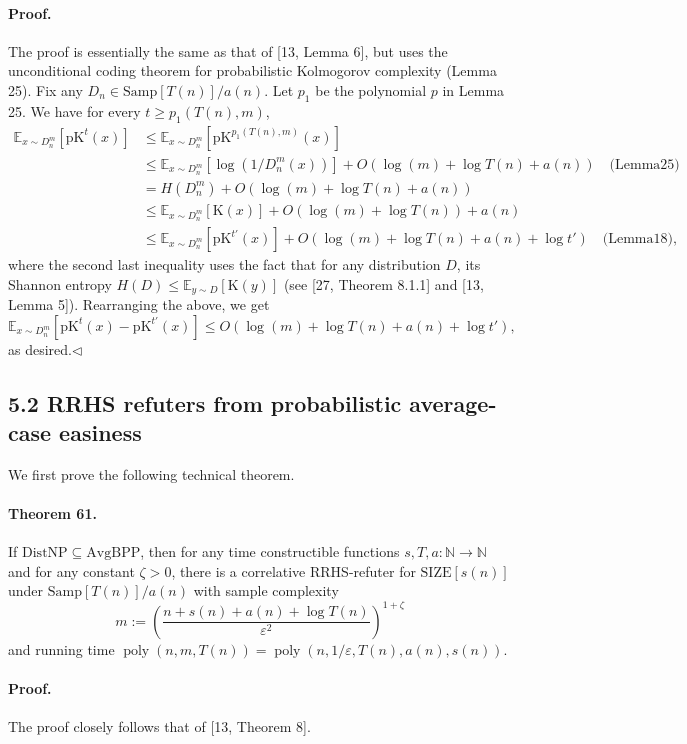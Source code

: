 \paragraph{Proof.} The proof is essentially the same as that of [13, Lemma 6], but uses the unconditional coding theorem for probabilistic Kolmogorov complexity (Lemma 25).
Fix any $D_n\in\mathrm{Samp}[T(n)]/a(n)$. Let $p_1$ be the polynomial $p$ in Lemma 25. We have for every $t\geq p_1(T(n),m)$,
\begin{align*}
\mathbb E_{x\sim D_n^m}[\mathrm{pK}^t(x)]&\leq\mathbb E_{x\sim D_n^m}[\mathrm{pK}^{p_1(T(n),m)}(x)]\\
&\leq\mathbb E_{x\sim D_n^m}[\log(1/D_n^m(x))]+O(\log(m)+\log T(n)+a(n))\quad\text{(Lemma25)}\\
&=H(D_n^m)+O(\log(m)+\log T(n)+a(n))\\
&\leq\mathbb E_{x\sim D_n^m}[\mathrm K(x)]+O(\log(m)+\log T(n))+a(n)\\
&\leq\mathbb E_{x\sim D_n^m}[\mathrm{pK}^{t'}(x)]+O(\log(m)+\log T(n)+a(n)+\log t')\quad\text{(Lemma18)},
\end{align*}
where the second last inequality uses the fact that for any distribution $D$, its Shannon entropy $H(D)\leq\mathbb E_{y\sim D}[\mathrm K(y)]$ (see [27, Theorem 8.1.1] and [13, Lemma 5]). Rearranging the above, we get
\[\mathbb E_{x\sim D_n^m}[\mathrm{pK}^t(x)-\mathrm{pK}^{t'}(x)]\leq O(\log(m)+\log T(n)+a(n)+\log t'),\]
as desired.\hfill$\triangleleft$
\subsection*{5.2 RRHS refuters from probabilistic average-case easiness}
We first prove the following technical theorem.
\paragraph{Theorem 61.} If $\mathrm{DistNP}\subseteq\mathrm{AvgBPP}$, then for any time constructible functions $s,T,a:\mathbb N\to\mathbb N$ and for any constant $\zeta>0$, there is a correlative RRHS-refuter for $\mathrm{SIZE}[s(n)]$ under $\mathrm{Samp}[T(n)]/a(n)$ with sample complexity
\[m:=\left(\frac{n+s(n)+a(n)+\log T(n)}{\varepsilon^2}\right)^{1+\zeta}\]
and running time $\operatorname{poly}(n,m,T(n))=\operatorname{poly}(n,1/\varepsilon,T(n),a(n),s(n))$.
\paragraph{Proof.} The proof closely follows that of [13, Theorem 8].
